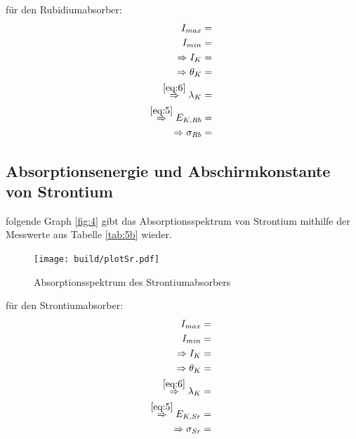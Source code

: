     \justifying für den Rubidiumabsorber:
    \begin{subequations}\label{eq:23}
    \begin{align}
        I_{max} &= \text{} \label{eq:23a}\\
        I_{min} &= \text{} \label{eq:23b}\\
        \Rightarrow I_K &= \text{} \label{eq:23c}\\
        \Rightarrow \theta_K &= \text{} \label{eq:23d}\\
        \stackrel{\eqref{eq:6}}{\Rightarrow} \lambda_K &= \text{} \label{eq:23e}\\
        \stackrel{\eqref{eq:5}}{\Rightarrow} E_{K,Rb} &= \text{} \label{eq:23f}\\
        \Rightarrow \sigma_{Rb} &= \text{} \label{eq:23g}
    \end{align}
    \end{subequations}

\subsection{Absorptionsenergie und Abschirmkonstante von Strontium}

    \justifying folgende Graph \ref{fig:4} gibt das Absorptionsspektrum von Strontium mithilfe der Messwerte aus Tabelle \ref{tab:5b} 
    wieder.

    \begin{figure}[H]
        \centering
        \texttt{[image: build/plotSr.pdf]}
        \caption{Absorptionsspektrum des Strontiumabsorbers}
        \label{fig:7}
    \end{figure}

    \justifying für den Strontiumabsorber:
    \begin{subequations}\label{eq:24}
    \begin{align}
        I_{max} &= \text{} \label{eq:24a}\\
        I_{min} &= \text{} \label{eq:24b}\\
        \Rightarrow I_K &= \text{} \label{eq:24c}\\
        \Rightarrow \theta_K &= \text{} \label{eq:24d}\\
        \stackrel{\eqref{eq:6}}{\Rightarrow} \lambda_K &= \text{} \label{eq:24e}\\
        \stackrel{\eqref{eq:5}}{\Rightarrow} E_{K,Sr} &= \text{} \label{eq:24f}\\
        \Rightarrow \sigma_{Sr} &= \text{} \label{eq:24g}
    \end{align}
    \end{subequations}

